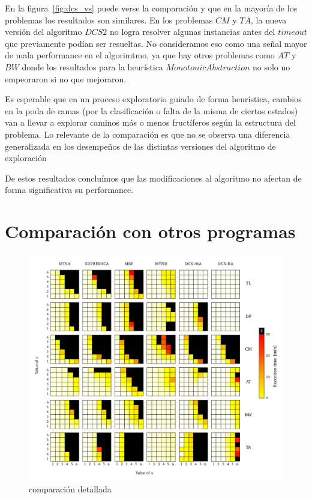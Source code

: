 En la figura~\ref{fig:dcs_vs} puede verse la comparación y que en la mayoría de los problemas los resultados son similares. En los problemas $CM$ y $TA$, la nueva versión del algoritmo $DCS2$ no logra resolver algunas instancias antes del $timeout$ que previamente podían ser resueltas. No consideramos eso como una señal mayor de mala performance en el algorimtmo, ya que hay otros problemas como $AT$ y $BW$ donde los resultados para la heurística $Monotonic Abstraction$ no solo no empeoraron si no que mejoraron.

Es esperable que en un proceso exploratorio guiado de forma heurística, cambios en la poda de ramas (por la clasificación o falta de la misma de ciertos estados) van a llevar a explorar caminos más o menos fructíferos según la estructura del problema. Lo relevante de la comparación es que no se observa una diferencia generalizada en los desempeños de las distintas versiones del algoritmo de exploración

De estos resultados concluímos que las modificaciones al algoritmo no afectan de forma significativa su performance.

\section{Comparación con otros programas}


\begin{figure}[htb]
	\centering
	\includegraphics[width=\linewidth]{figures/nuestrosResults/detailed.pdf}  
	\caption{comparación detallada}
	\label{fig:vs_otros}
\end{figure}

